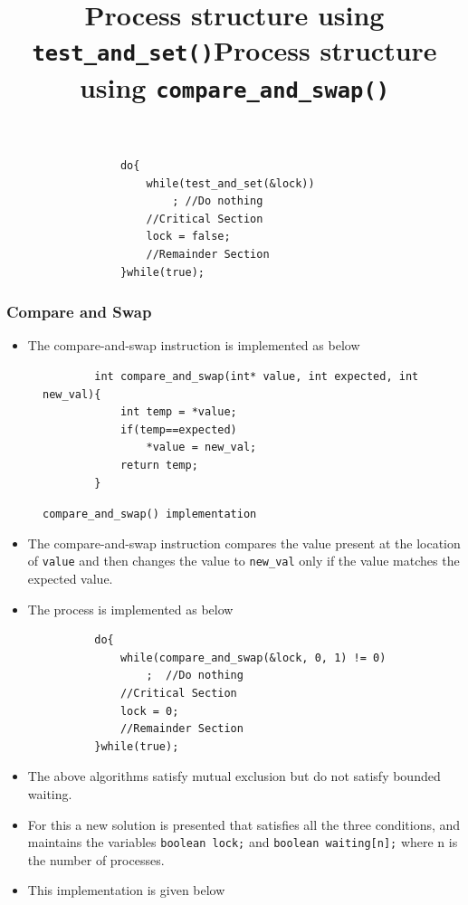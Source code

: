 \documentclass{article}
\theoremstyle{plain}
\theoremstyle{definition}
\begin{document}
\begin{figure}[h]
    \centering
        \begin{verbatim}
            do{
                while(test_and_set(&lock))
                    ; //Do nothing
                //Critical Section
                lock = false;
                //Remainder Section
            }while(true);
        \end{verbatim}
        \title{Process structure using \texttt{test\_and\_set()}}
\end{figure}

\subsubsection{Compare and Swap}
\begin{itemize}
    \item The compare-and-swap instruction is implemented as below
\end{itemize}
\begin{figure}[h]
    \centering
    \begin{verbatim}
        int compare_and_swap(int* value, int expected, int new_val){
            int temp = *value;
            if(temp==expected)
                *value = new_val;
            return temp;
        }
    \end{verbatim}
    \texttt{\texttt{compare\_and\_swap()} implementation}
\end{figure}

\begin{itemize}
    \item The compare-and-swap instruction compares the value present at the location of \texttt{value} and then changes the value to \texttt{new\_val} only if the value matches the expected value. 
    
    \item The process is implemented as below
\end{itemize}
\begin{figure}[!h]
    \centering
    \begin{verbatim}
        do{
            while(compare_and_swap(&lock, 0, 1) != 0)
                ;  //Do nothing
            //Critical Section
            lock = 0;
            //Remainder Section
        }while(true);
    \end{verbatim}
    \title{Process structure using \texttt{compare\_and\_swap()}}
\end{figure}

\begin{itemize}
    \item The above algorithms satisfy mutual exclusion but do not satisfy bounded waiting. 
    
    \item For this a new solution is presented that satisfies all the three conditions, and maintains the variables \texttt{boolean lock;} and \texttt{boolean waiting[n];} where n is the number of processes. 
    
    \item This implementation is given below
\end{itemize}
\end{document}
